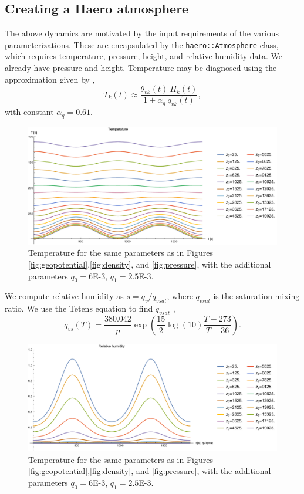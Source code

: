 \subsection{Creating a Haero atmosphere}

The above dynamics are motivated by the input requirements of the various parameterizations.  
These are encapsulated by the \texttt{haero::Atmosphere} class, which requires temperature, pressure, height, and relative humidity data. 
We already have pressure and height.
Temperature may be diagnosed using the approximation given by \cite[eq.~(2.3)]{KlempWilhelmson1978},
\begin{equation}
  T_k(t) \approx \frac{\theta_{vk}(t) ~ \Pi_k(t)}{1+\alpha_q ~ q_{vk}(t)},
\end{equation}
with constant $\alpha_q = 0.61$.

\begin{figure}[H]
  \centering
  \includegraphics[width=\linewidth]{figures/temperature_plot}
  \caption{Temperature for the same parameters as in Figures \ref{fig:geopotential},\ref{fig:density}, and \ref{fig:pressure}, with the additional parameters $q_{0}=6$E-3, $q_1=2.5$E-3.}\label{fig:temperature}
\end{figure}

We compute relative humidity as $s = q_v/q_{vsat}$, where $q_{vsat}$ is the saturation mixing ratio.
We use the Tetens equation to find $q_{vsat}$ \cite[eqn. (A1)]{SoongOgura1973},
\begin{equation}\label{eq:tetens}
  q_{vs}(T) = \frac{380.042}{p}\exp\left(\frac{15}{2}\log(10) \frac{T-273}{T-36}\right).
\end{equation}

\begin{figure}[H]
\centering
\includegraphics[width=\linewidth]{figures/relhumidity_plot}
\caption{Temperature for the same parameters as in Figures \ref{fig:geopotential},\ref{fig:density}, and \ref{fig:pressure}, with the additional parameters $q_{0}=6$E-3, $q_1=2.5$E-3.}\label{fig:humidity}
\end{figure}


